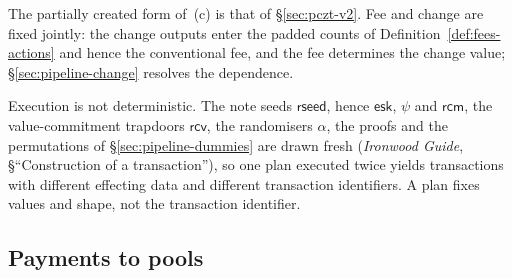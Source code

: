 \documentclass[11pt,a4paper]{article}
\theoremstyle{definition}
\newcommand{\rcv}{\ensuremath{\mathsf{rcv}}}
\newcommand{\rcm}{\ensuremath{\mathsf{rcm}}}
\begin{document}
The partially created form of~(c) is that of \S\ref{sec:pczt-v2}. Fee and
change are fixed jointly: the change outputs enter the padded counts of
Definition~\ref{def:fees-actions} and hence the conventional fee, and the
fee determines the change value; \S\ref{sec:pipeline-change} resolves the
dependence.

Execution is not deterministic. The note seeds $\mathsf{rseed}$, hence
$\mathsf{esk}$, $\psi$ and $\rcm$, the value-commitment trapdoors $\rcv$,
the randomisers $\alpha$, the proofs and the permutations of
\S\ref{sec:pipeline-dummies} are drawn fresh (\emph{Ironwood Guide},
\S``Construction of a transaction''), so one plan executed twice yields
transactions with different effecting data and different transaction
identifiers. A plan fixes values and shape, not the transaction identifier.

\subsection{Payments to pools}\label{sec:pipeline-routing}
\end{document}
